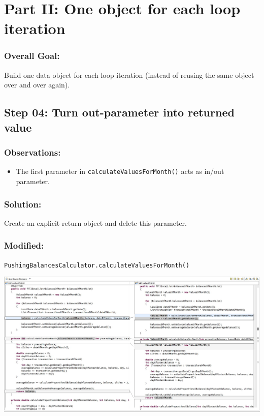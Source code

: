 \documentclass[a4paper,fleqn,titlepage,11pt]{article}
\begin{document}
\section*{Part II: One object for each loop iteration}

\subsubsection*{Overall Goal:}

Build one data object for each loop iteration (instead of reusing the same object over and over again).


\subsection*{Step 04: Turn out-parameter into returned value}

\subsubsection*{Observations:}
\begin{itemize}
\item The first parameter in \texttt{calculateValuesForMonth()} acts as in/out parameter.
\end{itemize}

\subsubsection*{Solution:}
Create an explicit return object and delete this parameter.

\subsubsection*{Modified:}

\texttt{PushingBalancesCalculator.calculateValuesForMonth()}

\includegraphics[width=1\textwidth]{CompareViews/03-04.jpg}
\end{document}
